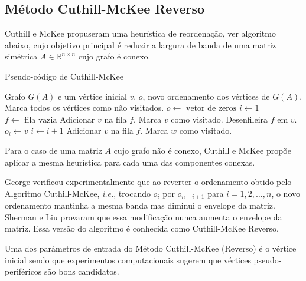 \subsection{Método Cuthill-McKee Reverso}
Cuthill e McKee \cite{Cuthill:1969:ReducingBandwidth} propuseram uma heurística de
reordenação, ver algoritmo abaixo, cujo objetivo principal é reduzir a largura
de banda de uma matriz simétrica $A \in \mathbb{R}^{n \times n}$ cujo grafo
é conexo.
\begin{algorithm}[hbt]
    \caption{Pseudo-código de Cuthill-McKee}
    \label{alg:rcm}
    \begin{algorithmic}[1]
        \REQUIRE Grafo $G(A)$ e um vértice inicial $v$.
        \ENSURE $o$, novo ordenamento dos vértices de $G(A)$.
        \STATE Marca todos os vértices como não visitados.
        \STATE $o \longleftarrow \text{ vetor de zeros}$
        \STATE $i \longleftarrow 1$
        \STATE $f \longleftarrow \text{ fila vazia}$
        \STATE Adicionar $v$ na fila $f$.
        \STATE Marca $v$ como visitado.
            \STATE Desenfileira $f$ em $v$.
            \STATE $o_i \longleftarrow v$
            \STATE $i \longleftarrow i + 1$
                    \STATE Adicionar $v$ na fila $f$.
                    \STATE Marca $w$ como visitado.
                \ENDIF
            \ENDFOR
        \ENDWHILE
    \end{algorithmic}
\end{algorithm}

Para o caso de uma matriz $A$ cujo grafo não é conexo, Cuthill e McKee propõe
aplicar a mesma heurística para cada uma das componentes conexas.

George \cite{George:1971:ComputerImplementation} verificou
experimentalmente que ao reverter o ordenamento obtido pelo Algoritmo
Cuthill-McKee, \textit{i.e.}, trocando $o_i$ por $o_{n - i + 1}$ para $i = 1, 2,
\ldots, n$, o novo ordenamento mantinha a mesma banda mas diminui o
envelope da matriz. Sherman e Liu \cite{Liu:1976:ComparativeCuthillMcKee}
provaram que essa modificação nunca aumenta o envelope da matriz. Essa versão do
algoritmo é conhecida como Cuthill-McKee Reverso.

Uma dos parâmetros de entrada do Método Cuthill-McKee (Reverso) é o vértice inicial sendo
que experimentos computacionais \cite{Cuthill:1969:ReducingBandwidth} sugerem que
vértices pseudo-periféricos são bons candidatos.

